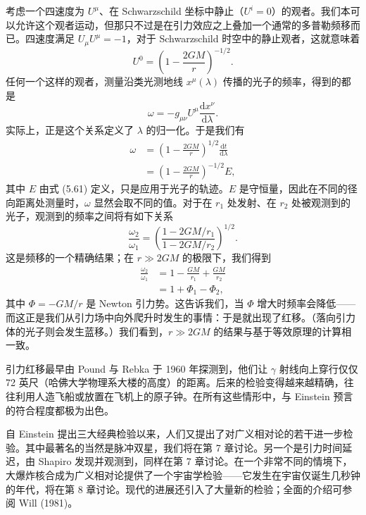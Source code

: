 
考虑一个四速度为 $U^\mu$、在 Schwarzschild 坐标中静止（$U^i = 0$）的观者。我们本可以允许这个观者运动，但那只不过是在引力效应之上叠加一个通常的多普勒频移而已。四速度满足 $U_\mu U^\mu = -1$，对于 Schwarzschild 时空中的静止观者，这就意味着
\begin{equation*}
U^0 = \left(1 - \frac{2GM}{r}\right)^{-1/2}.
\tag{5.99}
\end{equation*}
任何一个这样的观者，测量沿类光测地线 $x^\mu(\lambda)$ 传播的光子的频率，得到的都是
\begin{equation*}
\omega = -g_{\mu\nu}U^\mu\frac{\mathrm{d}x^\nu}{\mathrm{d}\lambda}.
\tag{5.100}
\end{equation*}
实际上，正是这个关系定义了 $\lambda$ 的归一化。于是我们有
\begin{align*}
\omega &= \left(1 - \frac{2GM}{r}\right)^{1/2}\frac{\mathrm{d}t}{\mathrm{d}\lambda}
\tag{5.101}\\
&= \left(1 - \frac{2GM}{r}\right)^{-1/2}E,
\tag{5.102}
\end{align*}
其中 $E$ 由式 (5.61) 定义，只是应用于光子的轨迹。$E$ 是守恒量，因此在不同的径向距离处测量时，$\omega$ 显然会取不同的值。对于在 $r_1$ 处发射、在 $r_2$ 处被观测到的光子，观测到的频率之间将有如下关系
\begin{equation*}
\frac{\omega_2}{\omega_1} = \left(\frac{1 - 2GM/r_1}{1 - 2GM/r_2}\right)^{1/2}.
\tag{5.103}
\end{equation*}
这是频移的一个精确结果；在 $r \gg 2GM$ 的极限下，我们得到
\begin{align*}
\frac{\omega_2}{\omega_1} &= 1 - \frac{GM}{r_1} + \frac{GM}{r_2}\\
&= 1 + \Phi_1 - \Phi_2,
\tag{5.104}
\end{align*}
其中 $\Phi = -GM/r$ 是 Newton 引力势。这告诉我们，当 $\Phi$ 增大时频率会降低——而这正是我们从引力场中向外爬升时发生的事情：于是就出现了红移。（落向引力体的光子则会发生蓝移。）我们看到，$r \gg 2GM$ 的结果与基于等效原理的计算相一致。

引力红移最早由 Pound 与 Rebka 于 1960 年探测到，他们让 $\gamma$ 射线向上穿行仅仅 72 英尺（哈佛大学物理系大楼的高度）的距离。后来的检验变得越来越精确，往往利用人造飞船或放置在飞机上的原子钟。在所有这些情形中，与 Einstein 预言的符合程度都极为出色。

自 Einstein 提出三大经典检验以来，人们又提出了对广义相对论的若干进一步检验。其中最著名的当然是脉冲双星，我们将在第 7 章讨论。另一个是引力时间延迟，由 Shapiro 发现并观测到，同样在第 7 章讨论。在一个非常不同的情境下，大爆炸核合成为广义相对论提供了一个宇宙学检验——它发生在宇宙仅诞生几秒钟的年代，将在第 8 章讨论。现代的进展还引入了大量新的检验；全面的介绍可参阅 Will (1981)。

